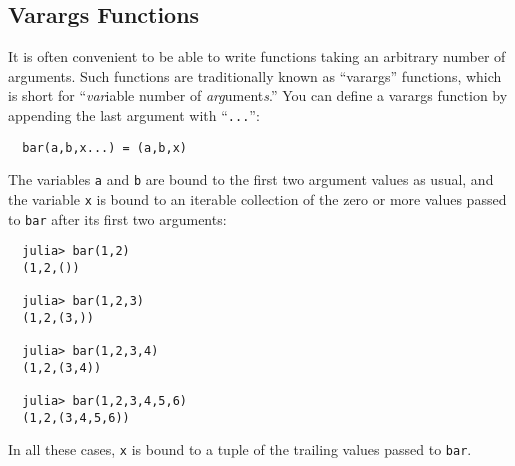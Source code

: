 \documentclass{article}
\begin{document}
\subsection{Varargs Functions}

It is often convenient to be able to write functions taking an arbitrary number of arguments.
Such functions are traditionally known as ``varargs'' functions, which is short for ``\emph{var}iable number of \emph{arg}ument\emph{s}.''
You can define a varargs function by appending the last argument with ``\verb|...|'':
\begin{verbatim}
  bar(a,b,x...) = (a,b,x)
\end{verbatim}
The variables \verb|a| and \verb|b| are bound to the first two argument values as usual, and the variable \verb|x| is bound to an iterable collection of the zero or more values passed to \verb|bar| after its first two arguments:
\begin{verbatim}
  julia> bar(1,2)
  (1,2,())

  julia> bar(1,2,3)
  (1,2,(3,))

  julia> bar(1,2,3,4)
  (1,2,(3,4))

  julia> bar(1,2,3,4,5,6)
  (1,2,(3,4,5,6))
\end{verbatim}
In all these cases, \verb|x| is bound to a tuple of the trailing values passed to \verb|bar|.
\end{document}
